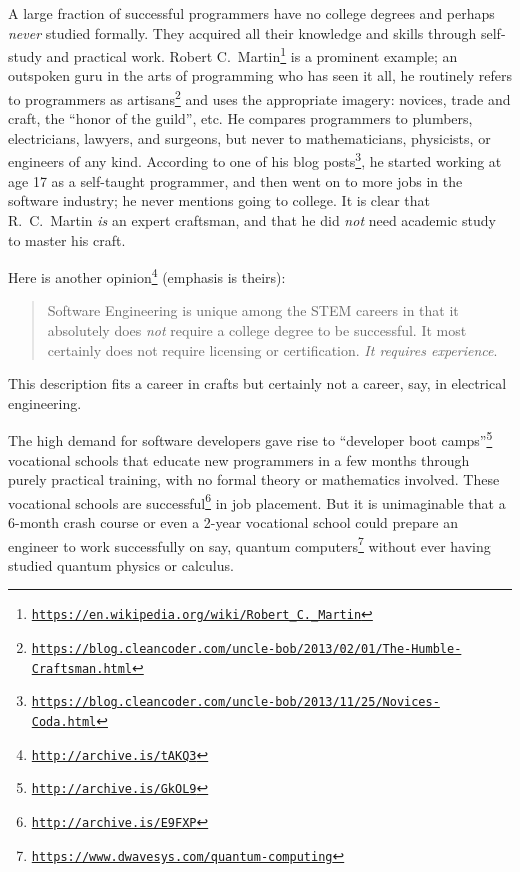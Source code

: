 A large fraction of successful programmers have no college degrees
and perhaps \emph{never} studied formally. They acquired all their
knowledge and skills through self-study and practical work. Robert
C.~Martin\footnote{\texttt{\href{https://en.wikipedia.org/wiki/Robert_C._Martin}{https://en.wikipedia.org/wiki/Robert\_C.\_Martin}}}
is a prominent example; an outspoken guru in the arts of programming
who has seen it all, he routinely refers to programmers as artisans\footnote{\texttt{\href{https://blog.cleancoder.com/uncle-bob/2013/02/01/The-Humble-Craftsman.html}{https://blog.cleancoder.com/uncle-bob/2013/02/01/The-Humble-Craftsman.html}}}
and uses the appropriate imagery: novices, trade and craft, the ``honor
of the guild'', etc. He compares programmers to plumbers, electricians,
lawyers, and surgeons, but never to mathematicians, physicists, or
engineers of any kind. According to one of his blog posts\footnote{\texttt{\href{https://blog.cleancoder.com/uncle-bob/2013/11/25/Novices-Coda.html}{https://blog.cleancoder.com/uncle-bob/2013/11/25/Novices-Coda.html}}},
he started working at age 17 as a self-taught programmer, and then
went on to more jobs in the software industry; he never mentions going
to college. It is clear that R.~C.~Martin \emph{is} an expert craftsman,
and that he did \emph{not} need academic study to master his craft.

Here is another opinion\footnote{\texttt{\href{http://archive.is/tAKQ3}{http://archive.is/tAKQ3}}}
(emphasis is theirs):
\begin{quotation}
{\small{}Software Engineering is unique among the STEM careers in
that it absolutely does }\emph{\small{}not}{\small{} require a college
degree to be successful. It most certainly does not require licensing
or certification. }\emph{\small{}It requires experience}{\small{}.}{\small\par}
\end{quotation}
This description fits a career in crafts \textendash{} but certainly
not a career, say, in electrical engineering.

The high demand for software developers gave rise to ``developer
boot camps''\footnote{\texttt{\href{http://archive.is/GkOL9}{http://archive.is/GkOL9}}}
\textendash{} vocational schools that educate new programmers in a
few months through purely practical training, with no formal theory
or mathematics involved. These vocational schools are successful\footnote{\texttt{\href{http://archive.is/E9FXP}{http://archive.is/E9FXP}}}
in job placement. But it is unimaginable that a 6-month crash course
or even a 2-year vocational school could prepare an engineer to work
successfully on say, quantum computers\footnote{\texttt{\href{https://www.dwavesys.com/quantum-computing}{https://www.dwavesys.com/quantum-computing}}}
without ever having studied quantum physics or calculus.

